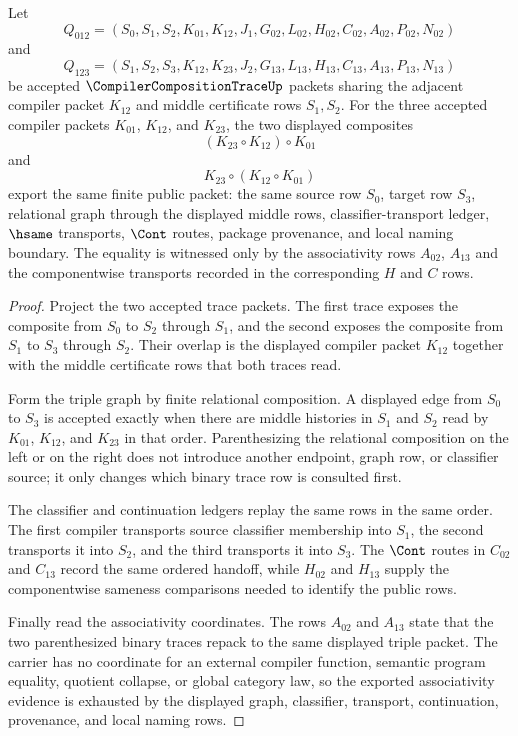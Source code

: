 \begin{theorem}
\label{thm:compiler-composition-trace-associativity}
Let
$$
Q_{012}=(S_0,S_1,S_2,K_{01},K_{12},J_{1},G_{02},L_{02},H_{02},C_{02},A_{02},P_{02},N_{02})
$$
and
$$
Q_{123}=(S_1,S_2,S_3,K_{12},K_{23},J_{2},G_{13},L_{13},H_{13},C_{13},A_{13},P_{13},N_{13})
$$
be accepted $\CompilerCompositionTraceUp$ packets sharing the adjacent compiler packet $K_{12}$ and middle certificate rows $S_1,S_2$. For the three accepted compiler packets $K_{01}$, $K_{12}$, and $K_{23}$, the two displayed composites
$$
(K_{23}\circ K_{12})\circ K_{01}
$$
and
$$
K_{23}\circ (K_{12}\circ K_{01})
$$
export the same finite public packet: the same source row $S_0$, target row $S_3$, relational graph through the displayed middle rows, classifier-transport ledger, $\hsame$ transports, $\Cont$ routes, package provenance, and local naming boundary. The equality is witnessed only by the associativity rows $A_{02}$, $A_{13}$ and the componentwise transports recorded in the corresponding $H$ and $C$ rows.
\end{theorem}
\begin{proof}
Project the two accepted trace packets. The first trace exposes the composite from $S_0$ to $S_2$ through $S_1$, and the second exposes the composite from $S_1$ to $S_3$ through $S_2$. Their overlap is the displayed compiler packet $K_{12}$ together with the middle certificate rows that both traces read.

Form the triple graph by finite relational composition. A displayed edge from $S_0$ to $S_3$ is accepted exactly when there are middle histories in $S_1$ and $S_2$ read by $K_{01}$, $K_{12}$, and $K_{23}$ in that order. Parenthesizing the relational composition on the left or on the right does not introduce another endpoint, graph row, or classifier source; it only changes which binary trace row is consulted first.

The classifier and continuation ledgers replay the same rows in the same order. The first compiler transports source classifier membership into $S_1$, the second transports it into $S_2$, and the third transports it into $S_3$. The $\Cont$ routes in $C_{02}$ and $C_{13}$ record the same ordered handoff, while $H_{02}$ and $H_{13}$ supply the componentwise sameness comparisons needed to identify the public rows.

Finally read the associativity coordinates. The rows $A_{02}$ and $A_{13}$ state that the two parenthesized binary traces repack to the same displayed triple packet. The carrier has no coordinate for an external compiler function, semantic program equality, quotient collapse, or global category law, so the exported associativity evidence is exhausted by the displayed graph, classifier, transport, continuation, provenance, and local naming rows.
\end{proof}

